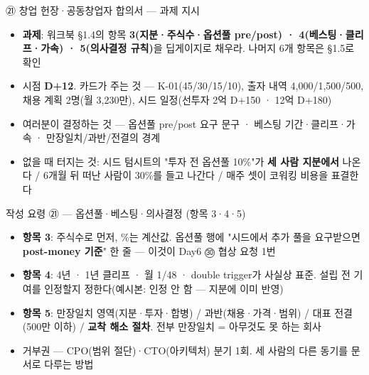 \begin{frame}{㉑ 창업 헌장·공동창업자 합의서 — 과제 지시}
\begin{itemize}
\item \textbf{과제}: 워크북 §1.4의 항목 \textbf{3(지분·주식수·옵션풀 pre/post) · 4(베스팅·클리프·가속) · 5(의사결정 규칙)}을 딥게이지로 채우라. 나머지 6개 항목은 §1.5로 확인
\item 시점 \textbf{D+12}. 카드가 주는 것 — K-01(45/30/15/10), 출자 내역 4,000/1,500/500, 채용 계획 2명(월 3,230만), 시드 일정(선투자 2억 D+150 · 12억 D+180)
\item 여러분이 결정하는 것 — 옵션풀 pre/post 요구 문구 · 베스팅 기간·클리프·가속 · 만장일치/과반/전결의 경계
\item 없을 때 터지는 것: 시드 텀시트의 "투자 전 옵션풀 10\%"가 \textbf{세 사람 지분에서} 나온다 / 6개월 뒤 떠난 사람이 30\%를 들고 나간다 / 매주 셋이 코워킹 비용을 표결한다
\end{itemize}
\end{frame}

\begin{frame}{작성 요령 ㉑ — 옵션풀·베스팅·의사결정 (항목 3·4·5)}
\begin{itemize}
\item \textbf{항목 3}: 주식수로 먼저, \%는 계산값. 옵션풀 행에 "시드에서 추가 풀을 요구받으면 \textbf{post-money 기준}" 한 줄 — 이것이 Day6 ㉚ 협상 요청 1번
\item \textbf{항목 4}: 4년 · 1년 클리프 · 월 1/48 · double trigger가 사실상 표준. 설립 전 기여를 인정할지 정한다(예시본: 인정 안 함 — 지분에 이미 반영)
\item \textbf{항목 5}: 만장일치 영역(지분·투자·합병) / 과반(채용·가격·범위) / 대표 전결(500만 이하) / \textbf{교착 해소 절차}. 전부 만장일치 = 아무것도 못 하는 회사
\item 거부권 — CPO(범위 절단)·CTO(아키텍처) 분기 1회. 세 사람의 다른 동기를 문서로 다루는 방법
\end{itemize}
\end{frame}


